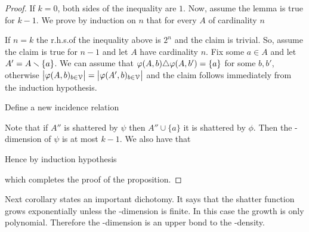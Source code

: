 \documentclass[sputnik.tex]{subfiles}
\begin{document}
\begin{proof}
If $k=0$, both sides of the inequality are $1$.
Now, assume the lemma is true for $k-1$.
We prove by induction on $n$ that for every $A$ of cardinality $n$


If $n=k$ the r.h.s.\@ of the inequality above is $2^n$ and the claim is trivial.
So, assume the claim is true for $n-1$ and let $A$ have cardinality $n$.
Fix some $a\in A$ and let $A'=A\smallsetminus\{a\}$.
We can assume that $\varphi(A,b)\triangle\varphi(A,b')=\{a\}$ for some $b,b'$, otherwise $\big|\varphi(A,b)_{b\in\EuScript V}\big|=\big|\varphi(A',b)_{b\in\EuScript V}\big|$ and the claim follows immediately from the induction hypothesis.

Define a new incidence relation



Note that if $A''$ is shattered by $\psi$ then $A''\cup\{a\}$ it is shattered by $\phi$.
Then the \vc-dimension of $\psi$ is at most $k-1$.
We also have that


Hence by induction hypothesis





which completes the proof of the proposition.
\end{proof}

Next corollary states an important dichotomy.
It says that the shatter function grows exponentially unless the \vc-dimension is finite.
In this case the growth is only polynomial.
Therefore the \vc-dimension is an upper bond to the \vc-density.
\end{document}

